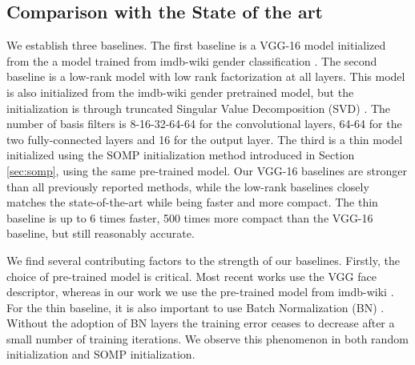 \documentclass[10pt,twocolumn,letterpaper]{article}
\begin{document}

\subsection{Comparison with the State of the art}

We establish three baselines. The first baseline is a VGG-16 model initialized from the a model trained from imdb-wiki gender classification \cite{imdb}. The second baseline is a low-rank model with low rank factorization at all layers. This model is also initialized from the imdb-wiki gender pretrained model, but the initialization is through truncated Singular Value Decomposition (SVD) \cite{denton2014exploiting}. The number of basis filters is 8-16-32-64-64 for the convolutional layers, 64-64 for the two fully-connected layers and 16 for the output layer. The third is a thin model initialized using the SOMP initialization method introduced in Section \ref{sec:somp}, using the same pre-trained model. Our VGG-16 baselines are stronger than all previously reported methods, while the low-rank baselines closely matches the state-of-the-art while being faster and more compact. The thin baseline is up to 6 times faster, 500 times more compact than the VGG-16 baseline, but still reasonably accurate. 

We find several contributing factors to the strength of our baselines. Firstly, the choice of pre-trained model is critical. Most recent works use the VGG face descriptor, whereas in our work we use the pre-trained model from  imdb-wiki \cite{imdb-wiki}. For the thin baseline, it is also important to use Batch Normalization (BN) \cite{ioffe2015batch}. Without the adoption of BN layers the training error ceases to decrease after a small number of training iterations. We observe this phenomenon in both random initialization and SOMP initialization.
\end{document}
